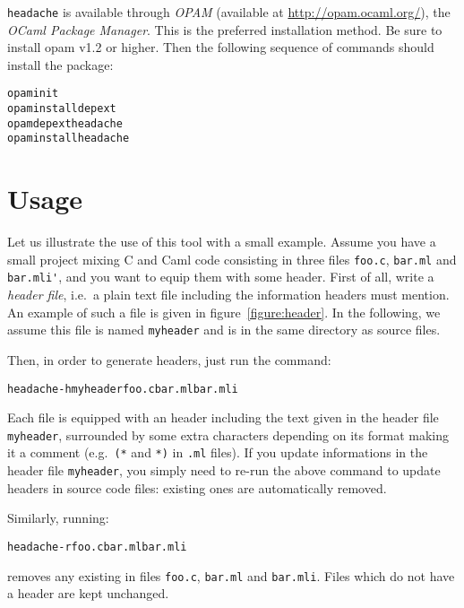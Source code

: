 \documentclass{article}
\newcommand{\headache}{\texttt{headache}}
\begin{document}
\headache{} is available through \emph{OPAM} (available at
\url{http://opam.ocaml.org/}), the \emph{OCaml Package Manager}.
This is the preferred installation method.
Be sure to install opam v1.2 or higher.
Then the following sequence of commands should install the package:
\begin{alltt}
  opam init
  opam install depext
  opam depext headache
  opam install headache
\end{alltt}

\section{Usage}

Let us illustrate the use of this tool with a small example.  Assume
you have a small project mixing C and Caml code consisting in three
files \verb+foo.c+, \verb+bar.ml+ and \verb+bar.mli'+, and you want to
equip them with some header.  First of all, write a \emph{header
  file}, i.e.\ a plain text file including the information headers
must mention.  An example of such a file is given in
figure~\ref{figure:header}.  In the following, we assume this file is
named \verb+myheader+ and is in the same directory as source files.

Then, in order to generate headers, just run the command:
\begin{alltt}
  headache -h myheader foo.c bar.ml bar.mli
\end{alltt}
Each file is equipped with an header including the text given in the
header file \verb+myheader+, surrounded by some extra characters
depending on its format making it a comment (e.g.\ \verb+(*+ and
\verb+*)+ in \verb+.ml+ files).  If you update informations in the
header file \verb+myheader+, you simply need to re-run the above
command to update headers in source code files: existing ones are
automatically removed.

Similarly, running:
\begin{alltt}
  headache -r foo.c bar.ml bar.mli
\end{alltt}
removes any existing in files \verb+foo.c+, \verb+bar.ml+ and
\verb+bar.mli+.  Files which do not have a header are kept unchanged.
\end{document}
